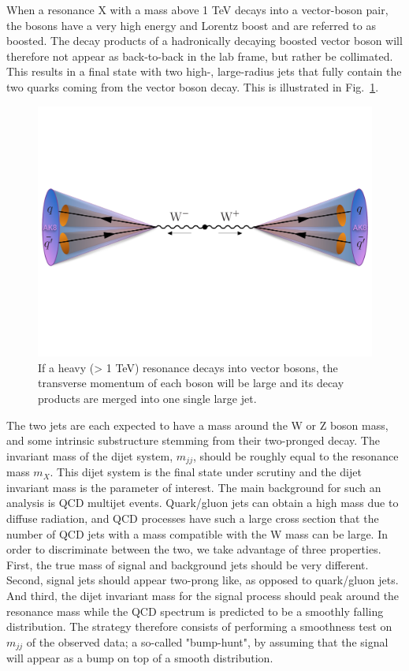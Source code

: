 \documentclass{pasa}%
\begin{document}
When a resonance X with a mass above 1 TeV decays into a vector-boson pair, the bosons have a very high energy and Lorentz boost and are referred to as boosted. The decay products of a hadronically decaying boosted vector boson will therefore not appear as back-to-back in the lab frame, but rather be collimated. This results in a final state with two high-\PT, large-radius jets that fully contain the two quarks coming from the vector boson decay. This is illustrated in Fig.~\ref{Fig1}.
\begin{figure}
\begin{center}
\includegraphics[width=\columnwidth]{figures/WWqqqq_merged.pdf}
\caption{If a heavy (> 1 TeV) resonance decays into vector bosons, the transverse momentum of each boson will be large and its decay products are merged into one single large  jet.}\label{Fig1}
\end{center}
\end{figure}
The two jets are each expected to have a mass around the W or Z boson mass, and some intrinsic substructure stemming from their two-pronged decay. The invariant mass of the dijet system, $m_{jj}$, should be roughly equal to the resonance mass $m_X$. This dijet system is the final state under scrutiny and the dijet invariant mass is the parameter of interest. The main background for such an analysis is QCD multijet events. Quark/gluon jets can obtain a high mass due to diffuse radiation, and QCD processes have such a large cross section that the number of QCD jets with a mass compatible with the W mass can be large. In order to discriminate between the two, we take advantage of three properties. First, the true mass of signal and background jets should be very different. Second, signal jets should appear two-prong like, as opposed to quark/gluon jets. And third, the dijet invariant mass for the signal process should peak around the resonance mass while the QCD spectrum is predicted to be a smoothly falling distribution. The strategy therefore consists of performing a smoothness test on $m_{jj}$ of the observed data; a so-called "bump-hunt", by assuming that the signal will appear as a bump on top of a smooth distribution.
\end{document}
